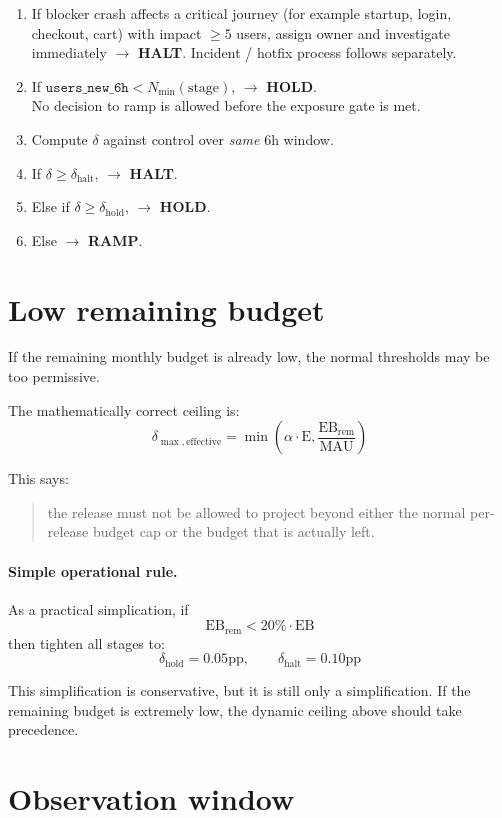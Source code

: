 \documentclass{article}
\newcommand{\MAU}{\mathrm{MAU}}
\newcommand{\EB}{\mathrm{EB}}
\newcommand{\E}{\mathrm{E}}
\newcommand{\pp}{\text{pp}}
\newcommand{\dhalt}{\delta_{\text{halt}}}
\newcommand{\dhold}{\delta_{\text{hold}}}
\begin{document}
\begin{enumerate}[leftmargin=1.8em]
    \item If blocker crash affects a critical journey (for example startup, login, checkout, cart) with impact $\ge 5$ users, assign owner and investigate immediately $\rightarrow$ \textbf{HALT}. Incident / hotfix process follows separately.
    \item If $\texttt{users\_new\_6h} < N_{\min}(\text{stage})$, $\rightarrow$ \textbf{HOLD}.\\
    No decision to ramp is allowed before the exposure gate is met.
    \item Compute $\delta$ against control over \emph{same} 6h window.
    \item If $\delta \ge \dhalt$, $\rightarrow$ \textbf{HALT}.
    \item Else if $\delta \ge \dhold$, $\rightarrow$ \textbf{HOLD}.
    \item Else $\rightarrow$ \textbf{RAMP}.
\end{enumerate}

\section{Low remaining budget}

If the remaining monthly budget is already low, the normal thresholds may be too permissive.

The mathematically correct ceiling is:
\[
\delta_{\max,\mathrm{effective}} = \min\left(\alpha \cdot \E, \frac{\EB_{\mathrm{rem}}}{\MAU}\right)
\]

This says:
\begin{quote}
the release must not be allowed to project beyond either the normal per-release budget cap or the budget that is actually left.
\end{quote}

\paragraph{Simple operational rule.}
As a practical simplication, if
\[
\EB_{\mathrm{rem}} < 20\% \cdot \EB
\]
then tighten all stages to:
\[
\dhold = 0.05\pp,
\qquad
\dhalt = 0.10\pp
\]

This simplification is conservative, but it is still only a simplification.
If the remaining budget is extremely low, the dynamic ceiling above should take precedence.

\section{Observation window}
\end{document}
